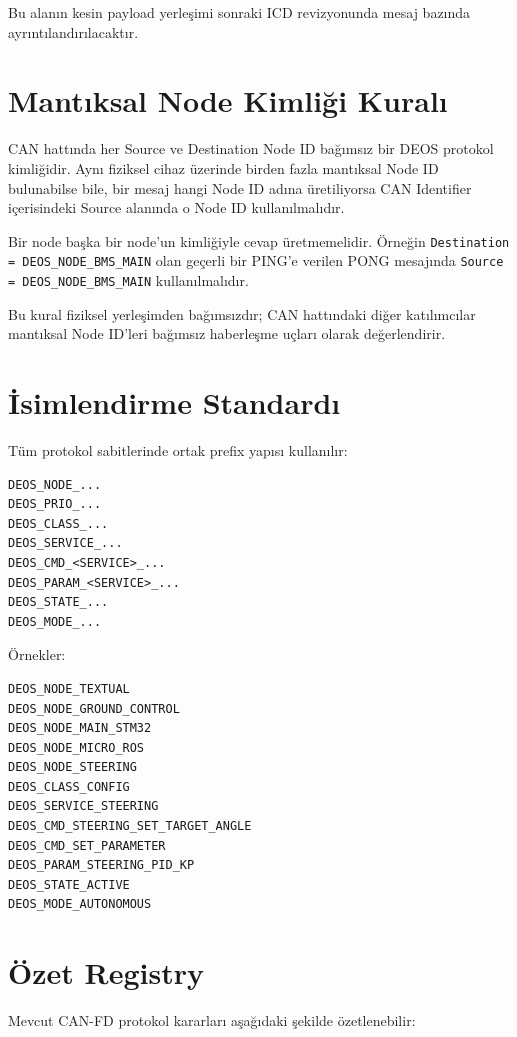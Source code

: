 \documentclass[a4paper,10pt]{article}
\newcommand{\code}[1]{\texttt{#1}}
\begin{document}
Bu alanın kesin payload yerleşimi sonraki ICD revizyonunda mesaj bazında ayrıntılandırılacaktır.


\section{Mantıksal Node Kimliği Kuralı}

CAN hattında her Source ve Destination Node ID bağımsız bir DEOS protokol kimliğidir.
Aynı fiziksel cihaz üzerinde birden fazla mantıksal Node ID bulunabilse bile, bir mesaj
hangi Node ID adına üretiliyorsa CAN Identifier içerisindeki Source alanında o Node ID
kullanılmalıdır.

Bir node başka bir node'un kimliğiyle cevap üretmemelidir. Örneğin
\code{Destination = DEOS\_NODE\_BMS\_MAIN} olan geçerli bir PING'e verilen PONG mesajında
\code{Source = DEOS\_NODE\_BMS\_MAIN} kullanılmalıdır.

Bu kural fiziksel yerleşimden bağımsızdır; CAN hattındaki diğer katılımcılar mantıksal
Node ID'leri bağımsız haberleşme uçları olarak değerlendirir.

\section{İsimlendirme Standardı}

Tüm protokol sabitlerinde ortak prefix yapısı kullanılır:

\begin{verbatim}
DEOS_NODE_...
DEOS_PRIO_...
DEOS_CLASS_...
DEOS_SERVICE_...
DEOS_CMD_<SERVICE>_...
DEOS_PARAM_<SERVICE>_...
DEOS_STATE_...
DEOS_MODE_...
\end{verbatim}

Örnekler:

\begin{verbatim}
DEOS_NODE_TEXTUAL
DEOS_NODE_GROUND_CONTROL
DEOS_NODE_MAIN_STM32
DEOS_NODE_MICRO_ROS
DEOS_NODE_STEERING
DEOS_CLASS_CONFIG
DEOS_SERVICE_STEERING
DEOS_CMD_STEERING_SET_TARGET_ANGLE
DEOS_CMD_SET_PARAMETER
DEOS_PARAM_STEERING_PID_KP
DEOS_STATE_ACTIVE
DEOS_MODE_AUTONOMOUS
\end{verbatim}


\section{Özet Registry}

Mevcut CAN-FD protokol kararları aşağıdaki şekilde özetlenebilir:
\end{document}
